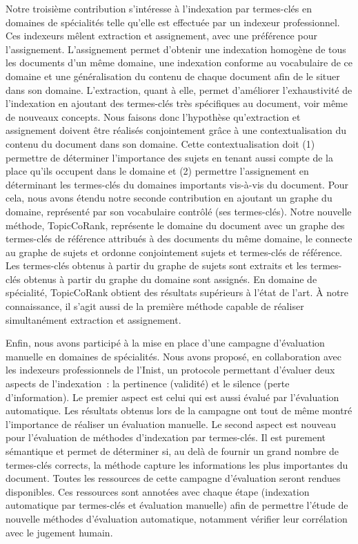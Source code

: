     Notre troisième contribution s'intéresse à l'indexation par termes-clés en
    domaines de spécialités telle qu'elle est effectuée par un indexeur
    professionnel. Ces indexeurs mêlent extraction et assignement, avec une
    préférence pour l'assignement. L'assignement permet d'obtenir une indexation
    homogène de tous les documents d'un même domaine, une indexation conforme au
    vocabulaire de ce domaine et une généralisation du contenu de chaque
    document afin de le situer dans son domaine. L'extraction, quant à elle,
    permet d'améliorer l'exhaustivité de l'indexation en ajoutant des
    termes-clés très spécifiques au document, voir même de nouveaux concepts.
    Nous faisons donc l'hypothèse qu'extraction et assignement doivent être
    réalisés conjointement grâce à une contextualisation du contenu du
    document dans son domaine. Cette contextualisation doit (1) permettre de
    déterminer l'importance des sujets en tenant aussi compte de la place qu'ils
    occupent dans le domaine et (2) permettre l'assignement en déterminant les
    termes-clés du domaines importants vis-à-vis du document.
    Pour cela, nous avons étendu notre seconde contribution en ajoutant un
    graphe du domaine, représenté par son vocabulaire contrôlé (ses
    termes-clés). Notre nouvelle méthode, TopicCoRank, représente le domaine du
    document avec un graphe des termes-clés de référence attribués à des
    documents du même domaine, le connecte au graphe de sujets et ordonne
    conjointement sujets et termes-clés de référence. Les termes-clés obtenus à
    partir du graphe de sujets sont extraits et les termes-clés obtenus à partir
    du graphe du domaine sont assignés. En domaine de spécialité, TopicCoRank
    obtient des résultats supérieurs à l'état de l'art. À notre connaissance, il
    s'agit aussi de la première méthode capable de réaliser simultanément
    extraction et assignement.

    Enfin, nous avons participé à la mise en place d'une campagne d'évaluation
    manuelle en domaines de spécialités. Nous avons proposé, en collaboration
    avec les indexeurs professionnels de l'Inist, un protocole permettant
    d'évaluer deux aspects de l'indexation~: la pertinence (validité) et le
    silence (perte d'information). Le premier aspect est celui qui est aussi
    évalué par l'évaluation automatique. Les résultats obtenus lors de la
    campagne ont tout de même montré l'importance de réaliser un évaluation
    manuelle. Le second aspect est nouveau pour
    l'évaluation de méthodes d'indexation par termes-clés. Il est purement
    sémantique et permet de déterminer si, au delà de fournir un grand nombre de
    termes-clés corrects, la méthode capture les informations les plus
    importantes du document. Toutes les ressources de cette campagne
    d'évaluation seront rendues disponibles. Ces ressources sont annotées avec
    chaque étape (indexation automatique par termes-clés et évaluation manuelle)
    afin de permettre l'étude de nouvelle méthodes d'évaluation automatique,
    notamment vérifier leur corrélation avec le jugement humain.

